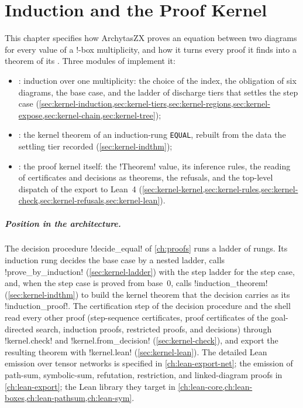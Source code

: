 \chapter{Induction and the Proof Kernel}\label{ch:kernel}
\begingroup\sloppy

This chapter specifies how ArchytasZX proves an equation between two diagrams for every value of a !-box multiplicity, and how it turns every proof it finds into a theorem of its . Three modules of  implement it:
\begin{itemize}
\item {}: induction over one multiplicity: the choice of the index, the obligation of six diagrams, the base case, and the ladder of discharge tiers that settles the step case (\cref{sec:kernel-induction,sec:kernel-tiers,sec:kernel-regions,sec:kernel-expose,sec:kernel-chain,sec:kernel-tree});
\item {}: the kernel theorem of an induction-rung \texttt{EQUAL}, rebuilt from the data the settling tier recorded (\cref{sec:kernel-indthm});
\item {}: the proof kernel itself: the \py!Theorem! value, its inference rules, the reading of certificates and decisions as theorems, the refusals, and the top-level dispatch of the export to Lean~4 (\cref{sec:kernel-kernel,sec:kernel-rules,sec:kernel-check,sec:kernel-refusals,sec:kernel-lean}).
\end{itemize}

\paragraph{Position in the architecture.} The decision procedure \py!decide_equal! of \cref{ch:proofs} runs a ladder of rungs. Its induction rung decides the base case by a nested ladder, calls \py!prove_by_induction! (\cref{sec:kernel-ladder}) with the step ladder for the step case, and, when the step case is proved from base~$0$, calls \py!induction_theorem! (\cref{sec:kernel-indthm}) to build the kernel theorem that the decision carries as its \py!induction_proof!. The certification step of the decision procedure and the shell read every other proof (step-sequence certificates, proof certificates of the goal-directed search, induction proofs, restricted proofs, and decisions) through \py!kernel.check! and \py!kernel.from_decision! (\cref{sec:kernel-check}), and export the resulting theorem with \py!kernel.lean! (\cref{sec:kernel-lean}). The detailed Lean emission over tensor networks is specified in \cref{ch:lean-export-net}; the emission of path-sum, symbolic-sum, refutation, restriction, and linked-diagram proofs in \cref{ch:lean-export}; the Lean library they target in \cref{ch:lean-core,ch:lean-boxes,ch:lean-pathsum,ch:lean-sym}.

